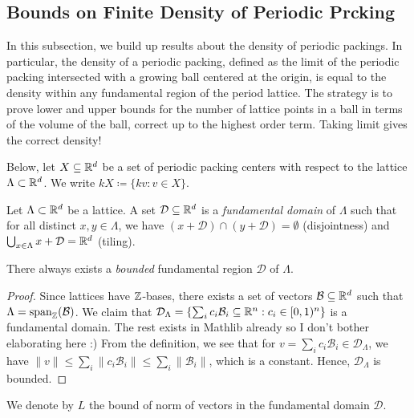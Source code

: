 \subsection{Bounds on Finite Density of Periodic Prcking}

In this subsection, we build up results about the density of periodic packings. In particular, the density of a periodic packing, defined as the limit of the periodic packing intersected with a growing ball centered at the origin, is equal to the density within any fundamental region of the period lattice. The strategy is to prove lower and upper bounds for the number of lattice points in a ball in terms of the volume of the ball, correct up to the highest order term. Taking limit gives the correct density!

Below, let $X \subseteq \mathbb{R}^d$ be a set of periodic packing centers with respect to the lattice $\Lambda \subset \mathbb{R}^d$. We write $kX \coloneqq \{kv : v \in X\}$.

\begin{definition}\label{fd}\lean{}\uses{}
  Let $\Lambda \subset \mathbb{R}^d$ be a lattice. A set $\mathcal{D} \subseteq \mathbb{R}^d$ is a \emph{fundamental domain} of $\Lambda$ such that for all distinct $x, y \in \Lambda$, we have $(x + \mathcal{D}) \cap (y + \mathcal{D}) = \emptyset$ (disjointness) and $\bigcup_{x \in \Lambda} x + \mathcal{D} = \mathbb{R}^d$ (tiling).
\end{definition}

\begin{lemma}\label{exists-bounded-fd}\lean{}
  There always exists a \emph{bounded} fundamental region $\mathcal{D}$ of $\Lambda$.
\end{lemma}
\begin{proof}
  Since lattices have $\mathbb{Z}$-bases, there exists a set of vectors $\mathcal{B} \subseteq \mathbb{R}^d$ such that $\Lambda = \mathrm{span}_{\mathbb{Z}}(\mathcal{B})$. We claim that $\mathcal{D}_{\Lambda} = \{\sum_i c_i\mathcal{B}_i \subseteq \mathbb{R}^n : c_i \in [0, 1)^n\}$ is a fundamental domain. The rest exists in Mathlib already so I don't bother elaborating here :) From the definition, we see that for $v = \sum_i c_i\mathcal{B}_i \in \mathcal{D}_{\Lambda}$, we have $\|v\| \leq \sum_i \|c_i\mathcal{B}_i\| \leq \sum_i \|\mathcal{B}_i\|$, which is a constant. Hence, $\mathcal{D}_{\Lambda}$ is bounded.
\end{proof}

We denote by $L$ the bound of norm of vectors in the fundamental domain $\mathcal{D}$.

